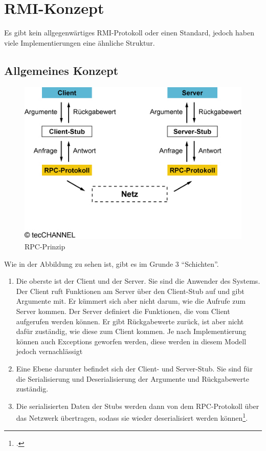 \documentclass[a4paper,oneside,10pt]{report}
\begin{document}
\section{RMI-Konzept}

Es gibt kein allgegenwärtiges RMI-Protokoll oder einen Standard, jedoch haben viele Implementierungen eine ähnliche Struktur. 

\subsection{Allgemeines Konzept}

\begin{figure}
	\centering
	\includegraphics{microsoft_rpc}
	\caption[]{RPC-Prinzip\footnotemark}
	\label{fig:rpc}
\end{figure}


Wie in der Abbildung zu sehen ist, gibt es im Grunde 3 "`Schichten"'. 
\begin{enumerate}
	\item Die oberste ist der Client und der Server. Sie sind die Anwender des Systems. Der Client ruft Funktionen am Server über den Client-Stub auf und gibt Argumente mit. Er kümmert sich aber nicht darum, wie die Aufrufe zum Server kommen. Der Server definiert die Funktionen, die vom Client aufgerufen werden können. Er gibt Rückgabewerte zurück, ist aber nicht dafür zuständig, wie diese zum Client kommen. Je nach Implementierung können auch Exceptions geworfen werden, diese werden in diesem Modell jedoch vernachlässigt
	\item Eine Ebene darunter befindet sich der Client- und Server-Stub. Sie sind für die Serialisierung und Deserialisierung der Argumente und Rückgabewerte zuständig.
	\item Die serialisierten Daten der Stubs werden dann von dem RPC-Protokoll über das Netzwerk übertragen, sodass sie wieder deserialisiert werden können\footcite{microsoft}. 
\end{enumerate}
\end{document}
